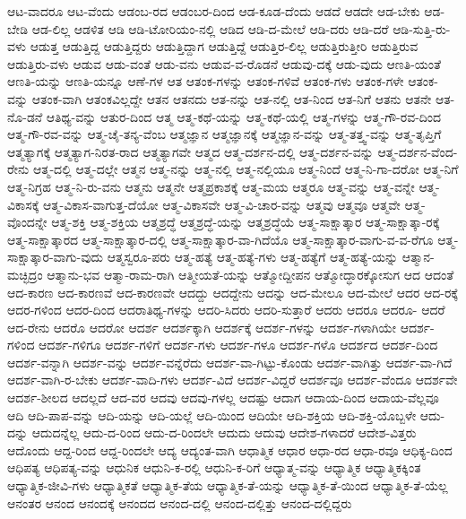 {ಆಟ-ವಾದರೂ
ಆಟ-ವೆಂದು
ಆಡಂಬ-ರದ
ಆಡಂಬರ-ದಿಂದ
ಆಡ-ಕೂಡ-ದೆಂದು
ಆಡದೆ
ಆಡದೇ
ಆಡ-ಬೇಕು
ಆಡ-ಬೇಡಿ
ಆಡ-ಲಿಲ್ಲ
ಆಡಳಿತ
ಆಡಿ
ಆಡಿ-ಟೋರಿಯಂ-ನಲ್ಲಿ
ಆಡಿದ
ಆಡಿ-ದ-ಮೇಲೆ
ಆಡಿ-ದರು
ಆಡಿ-ದರೆ
ಆಡಿ-ಸುತ್ತಿ-ರು-ವಳು
ಆಡುತ್ತ
ಆಡುತ್ತಿದ್ದ
ಆಡುತ್ತಿದ್ದರು
ಆಡುತ್ತಿದ್ದಾಗ
ಆಡುತ್ತಿದ್ದೆ
ಆಡುತ್ತಿರ-ಲಿಲ್ಲ
ಆಡುತ್ತಿರುತ್ತೀರಿ
ಆಡುತ್ತಿರುವ
ಆಡುತ್ತಿರು-ವಳು
ಆಡುವ
ಆಡು-ವಂತೆ
ಆಡು-ವನು
ಆಡುವ-ವ-ರೊಡನೆ
ಆಡುವು-ದಕ್ಕೆ
ಆಡು-ವುದು
ಆಣತಿ-ಯಂತೆ
ಆಣತಿ-ಯನ್ನು
ಆಣತಿ-ಯನ್ನೂ
ಆಣೆ-ಗಳ
ಆತ
ಆತಂಕ-ಗಳನ್ನು
ಆತಂಕ-ಗಳಿವೆ
ಆತಂಕ-ಗಳು
ಆತಂಕ-ಗಳೇ
ಆತಂಕ-ವನ್ನು
ಆತಂಕ-ವಾಗಿ
ಆತಂಕವಿಲ್ಲದ್ದೇ
ಆತನ
ಆತನದು
ಆತ-ನನ್ನು
ಆತ-ನಲ್ಲಿ
ಆತ-ನಿಂದ
ಆತ-ನಿಗೆ
ಆತನು
ಆತನೇ
ಆತ-ನೊ-ಡನೆ
ಆತಿಥ್ಯ-ವನ್ನು
ಆತುರ-ದಿಂದ
ಆತ್ಮ
ಆತ್ಮ-ಕಥೆ-ಯನ್ನು
ಆತ್ಮ-ಕಥೆ-ಯಲ್ಲಿ
ಆತ್ಮ-ಗಳನ್ನು
ಆತ್ಮ-ಗೌ-ರವ-ದಿಂದ
ಆತ್ಮ-ಗೌ-ರವ-ವನ್ನು
ಆತ್ಮ-ಚೈ-ತನ್ಯ-ವೆಂಬ
ಆತ್ಮಜ್ಞಾನ
ಆತ್ಮಜ್ಞಾನಕ್ಕೆ
ಆತ್ಮಜ್ಞಾನ-ವನ್ನು
ಆತ್ಮ-ತತ್ತ್ವ-ವನ್ನು
ಆತ್ಮ-ತೃಪ್ತಿಗೆ
ಆತ್ಮತ್ಯಾಗಕ್ಕೆ
ಆತ್ಮತ್ಯಾಗ-ನಿರತ-ರಾದ
ಆತ್ಮತ್ಯಾಗವೇ
ಆತ್ಮದ
ಆತ್ಮ-ದರ್ಶನ-ದಲ್ಲಿ
ಆತ್ಮ-ದರ್ಶನ-ವನ್ನು
ಆತ್ಮ-ದರ್ಶನ-ವೆಂದ-ರೇನು
ಆತ್ಮ-ದಲ್ಲಿ
ಆತ್ಮ-ದಲ್ಲೇ
ಆತ್ಮನ
ಆತ್ಮ-ನನ್ನು
ಆತ್ಮ-ನಲ್ಲಿ
ಆತ್ಮ-ನಲ್ಲಿಯೂ
ಆತ್ಮ-ನಿಂದೆ
ಆತ್ಮ-ನಿ-ಗಾ-ದರೋ
ಆತ್ಮ-ನಿಗೆ
ಆತ್ಮ-ನಿಗ್ರಹ
ಆತ್ಮ-ನಿ-ರು-ವನು
ಆತ್ಮನು
ಆತ್ಮನೇ
ಆತ್ಮಪ್ರಕಾಶಕ್ಕೆ
ಆತ್ಮ-ಮಯ
ಆತ್ಮರೂ
ಆತ್ಮ-ವನ್ನು
ಆತ್ಮ-ವನ್ನೇ
ಆತ್ಮ-ವಿಕಾಸಕ್ಕೆ
ಆತ್ಮ-ವಿಕಾಸ-ವಾಗುತ್ತ-ದೆಯೋ
ಆತ್ಮ-ವಿಕಾಸವೇ
ಆತ್ಮ-ವಿ-ಚಾರ-ವನ್ನು
ಆತ್ಮವು
ಆತ್ಮವೂ
ಆತ್ಮವೇ
ಆತ್ಮ-ವೊಂದನ್ನೇ
ಆತ್ಮ-ಶಕ್ತಿ
ಆತ್ಮ-ಶಕ್ತಿಯ
ಆತ್ಮಶ್ರದ್ಧೆ
ಆತ್ಮಶ್ರದ್ಧೆ-ಯನ್ನು
ಆತ್ಮಶ್ರದ್ಧೆಯೆ
ಆತ್ಮ-ಸಾಕ್ಷಾತ್ಕಾರ
ಆತ್ಮ-ಸಾಕ್ಷಾತ್ಕಾ-ರಕ್ಕೆ
ಆತ್ಮ-ಸಾಕ್ಷಾತ್ಕಾರದ
ಆತ್ಮ-ಸಾಕ್ಷಾತ್ಕಾರ-ದಲ್ಲಿ
ಆತ್ಮ-ಸಾಕ್ಷಾತ್ಕಾರ-ವಾ-ಗಿದೆಯೊ
ಆತ್ಮ-ಸಾಕ್ಷಾತ್ಕಾರ-ವಾಗು-ವ-ವ-ರೆಗೂ
ಆತ್ಮ-ಸಾಕ್ಷಾತ್ಕಾರ-ವಾಗು-ವುದು
ಆತ್ಮಸ್ವರೂ-ಪರು
ಆತ್ಮ-ಹತ್ಯೆ
ಆತ್ಮ-ಹತ್ಯೆ-ಗಳು
ಆತ್ಮ-ಹತ್ಯೆಗೆ
ಆತ್ಮ-ಹತ್ಯೆ-ಯನ್ನು
ಆತ್ಮಾನ-ಮಚ್ಛಿದ್ರಂ
ಆತ್ಮಾನು-ಭವ
ಆತ್ಮಾ-ರಾಮ-ರಾಗಿ
ಆತ್ಮೀಯತೆ-ಯನ್ನು
ಆತ್ಮೋದ್ದೀಪನ
ಆತ್ಮೋದ್ಧಾರಕ್ಕೋಸುಗ
ಆದ
ಆದಂತೆ
ಆದ-ಕಾರಣ
ಆದ-ಕಾರಣವೆ
ಆದ-ಕಾರಣವೇ
ಆದದ್ದು
ಆದದ್ದೇನು
ಆದನ್ನು
ಆದ-ಮೇಲೂ
ಆದ-ಮೇಲೆ
ಆದರ
ಆದ-ರಕ್ಕೆ
ಆದರ-ಗಳಿಂದ
ಆದರ-ದಿಂದ
ಆದರಾತಿಥ್ಯ-ಗಳನ್ನು
ಆದರಿ-ಸಿದರು
ಆದರಿ-ಸುತ್ತಾರೆ
ಆದರು
ಆದರೂ
ಆದರೂ-
ಆದರೆ
ಆದ-ರೇನು
ಆದರೊ
ಆದರೋ
ಆದರ್ಶ
ಆದರ್ಶಕ್ಕಾಗಿ
ಆದರ್ಶಕ್ಕೆ
ಆದರ್ಶ-ಗಳನ್ನು
ಆದರ್ಶ-ಗಳಾಗಿಯೇ
ಆದರ್ಶ-ಗಳಿಂದ
ಆದರ್ಶ-ಗಳಿಗೂ
ಆದರ್ಶ-ಗಳಿಗೆ
ಆದರ್ಶ-ಗಳು
ಆದರ್ಶ-ಗಳೂ
ಆದರ್ಶ-ಗಳೊ
ಆದರ್ಶದ
ಆದರ್ಶ-ದಿಂದ
ಆದರ್ಶ-ವನ್ನಾಗಿ
ಆದರ್ಶ-ವನ್ನು
ಆದರ್ಶ-ವನ್ನೆರೆದು
ಆದರ್ಶ-ವಾ-ಗಿಟ್ಟು-ಕೊಂಡು
ಆದರ್ಶ-ವಾಗಿತ್ತು
ಆದರ್ಶ-ವಾ-ಗಿದೆ
ಆದರ್ಶ-ವಾಗಿ-ರ-ಬೇಕು
ಆದರ್ಶ-ವಾದಿ-ಗಳು
ಆದರ್ಶ-ವಿದೆ
ಆದರ್ಶ-ವಿದ್ದರೆ
ಆದರ್ಶವೂ
ಆದರ್ಶ-ವೆಂದೂ
ಆದರ್ಶವೇ
ಆದರ್ಶ-ಶೀಲದ
ಆದಲ್ಲದೆ
ಆದ-ವರ
ಆದವು
ಆದವು-ಗಳಲ್ಲ
ಆದಷ್ಟು
ಆದಾಗ
ಆದಾಯ-ದಿಂದ
ಆದಾಯ-ವೆಲ್ಲವೂ
ಆದಿ
ಆದಿ-ಪಾಪ-ವನ್ನು
ಆದಿ-ಯನ್ನು
ಆದಿ-ಯಲ್ಲೆ
ಆದಿ-ಯಿಂದ
ಆದಿಯೇ
ಆದಿ-ಶಕ್ತಿಯ
ಆದಿ-ಶಕ್ತಿ-ಯೊಬ್ಬಳೇ
ಆದು-ದನ್ನು
ಆದುದನ್ನೆಲ್ಲ
ಆದು-ದ-ರಿಂದ
ಆದು-ದ-ರಿಂದಲೇ
ಆದುದು
ಆದುವು
ಆದೇಶ-ಗಳಾದರೆ
ಆದೇಶ-ವಿತ್ತರು
ಆದೊಂದು
ಆದ್ದ-ರಿಂದ
ಆದ್ದ-ರಿಂದಲೇ
ಆದ್ಯ
ಆದ್ಯಂತ-ವಾಗಿ
ಆಧಾತ್ಮಿಕ
ಆಧಾರ
ಆಧಾ-ರದ
ಆಧಾ-ರವೂ
ಆಧಿಕ್ಯ-ದಿಂದ
ಆಧಿಪತ್ಯ
ಆಧಿಪತ್ಯ-ವನ್ನು
ಆಧುನಿಕ
ಆಧುನಿ-ಕ-ರಲ್ಲಿ
ಆಧುನಿ-ಕ-ರಿಗೆ
ಆಧ್ಯಾತ್ಮ-ವನ್ನು
ಆಧ್ಯಾತ್ಮಿಕ
ಆಧ್ಯಾತ್ಮಿಕಕ್ಕಿಂತ
ಆಧ್ಯಾತ್ಮಿಕ-ಜೀವಿ-ಗಳು
ಆಧ್ಯಾತ್ಮಿಕತೆ
ಆಧ್ಯಾತ್ಮಿಕ-ತೆಯ
ಆಧ್ಯಾತ್ಮಿಕ-ತೆ-ಯನ್ನು
ಆಧ್ಯಾತ್ಮಿಕ-ತೆ-ಯಿಂದ
ಆಧ್ಯಾತ್ಮಿಕ-ತೆ-ಯೆಲ್ಲ
ಆನಂತರ
ಆನಂದ
ಆನಂದಕ್ಕೆ
ಆನಂದದ
ಆನಂದ-ದಲ್ಲಿ
ಆನಂದ-ದಲ್ಲಿತ್ತು
ಆನಂದ-ದಲ್ಲಿದ್ದರು
}
